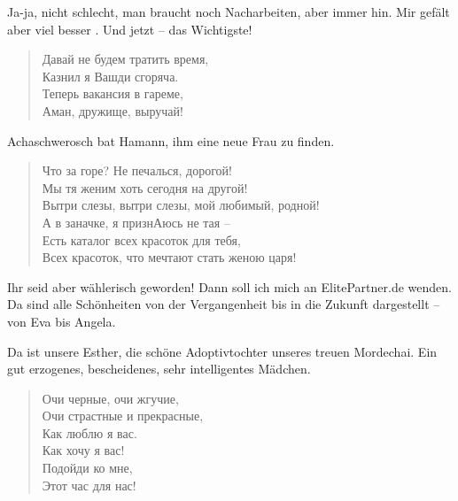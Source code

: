 \documentclass[12pt,a4paper,titlepage]{article}
\begin{document}
\begin{drama}
\ahspeaks
Ja-ja, nicht schlecht, man braucht noch Nacharbeiten, aber immer hin. 
Mir gefält aber viel besser .
Und jetzt -- das Wichtigste!

\ahspeaks {}
\begin{verse}
Давай не будем тратить время,\\
Казнил я Вашди сгоряча.\\
Теперь вакансия в гареме,\\
Аман, дружище, выручай!\\
\end{verse}

\uespeaks
Achaschwerosch bat Hamann, ihm eine neue Frau zu finden.

\amspeaks {}
\begin{verse}
Что за горе? Не печалься, дорогой!\\
Мы тя женим хоть сегодня на другой!\\
Вытри слезы, вытри слезы, мой любимый, родной!\\
А в заначке, я признАюсь не тая --\\
Есть каталог всех красоток для тебя,\\
Всех красоток, что мечтают стать женою царя!\\
\end{verse}



\amspeaks {}
Ihr seid aber wählerisch geworden! Dann soll ich mich an ElitePartner.de wenden.
Da sind alle Schönheiten von der Vergangenheit bis in die Zukunft dargestellt --
von Eva bis Angela.


\scene


\uespeaks
Da ist unsere Esther, die schöne Adoptivtochter unseres treuen Mordechai.
Ein gut erzogenes, bescheidenes, sehr intelligentes Mädchen.

\ahspeaks {}
\begin{verse}
Очи черные, очи жгучие,\\
Очи страстные и прекрасные,\\
Как люблю я вас.\\
Как хочу я вас!\\
Подойди ко мне,\\
Этот час для нас!\\
\end{verse}


\end{drama}
\end{document}
